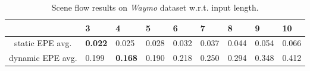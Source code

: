 
\begin{table}[t]
    \setlength{\tabcolsep}{6pt}
    \renewcommand{\arraystretch}{1.2}
	\centering
    \begin{tabularx}{\columnwidth}{c|YYYYYYYY}
    \toprule
    & 3 & 4 & 5 & 6 & 7 & 8 & 9 & 10 \\
    \midrule
    static EPE avg. & \textbf{0.022} & 0.025 & 0.028 & 0.032 & 0.037 & 0.044 & 0.054 & 0.066\\
    dynamic EPE avg. & 0.199 & \textbf{0.168} & 0.190 & 0.218 & 0.250 & 0.294 & 0.348 & 0.412 \\
    \bottomrule
    \end{tabularx}
    \caption{Scene flow results on \emph{Waymo} dataset w.r.t. input length.}
    \label{tab:generalisation}
\end{table}